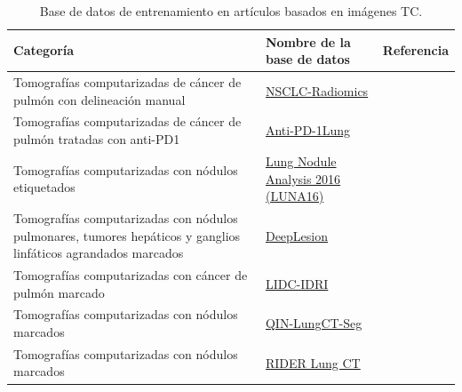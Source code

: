\documentclass[11pt,a4paper,openany]{article}
\begin{document}
    \begin{table}[H]
            \caption{Base de datos de entrenamiento en artículos basados en imágenes TC.\label{tab:TCDatabase}}
            \begin{tabular}{p{6.5cm} p{4cm}  p{4cm}}
            \hline
            \bf{Categoría} & \bf{Nombre de la base de datos} & \bf{Referencia} \\
            \hline
            Tomografías computarizadas de cáncer de pulmón con delineación manual & \href{https://www.cancerimagingarchive.net/collection/nsclc-radiomics/}{NSCLC-Radiomics} & \cite{Woo2021} \\
            \hline
            Tomografías computarizadas de cáncer de pulmón tratadas con anti-PD1 & \href{https://www.cancerimagingarchive.net/collection/anti-pd-1_lung/}{Anti-PD-1Lung} & \cite{Jiang2019} \\
            \hline
            Tomografías computarizadas con nódulos etiquetados & \href{https://luna16.grand-challenge.org/Data/}{Lung Nodule Analysis 2016 (LUNA16)} & \cite{Alakwaa2017,Salama2021,V2023} \\
            \hline
            Tomografías computarizadas con nódulos pulmonares, tumores hepáticos y ganglios linfáticos agrandados marcados & \href{https://nihcc.app.box.com/v/DeepLesion}{DeepLesion} & \cite{Tang2018,Xie2021} \\
            \hline
            Tomografías computarizadas con cáncer de pulmón marcado & \href{https://www.cancerimagingarchive.net/collection/lidc-idri/}{LIDC-IDRI} & \cite{Liu2018,Yang2021,Dutande2021,Aversano2022,V2023,Wu2023} \\
            \hline
            Tomografías computarizadas con nódulos marcados &\href{https://www.cancerimagingarchive.net/analysis-result/qin-lungct-seg/}{QIN-LungCT-Seg}& \cite{Tan2021,Woo2021}\\
            \hline
            Tomografías computarizadas con nódulos marcados & \href{https://www.cancerimagingarchive.net/collection/lidc-idri/}{RIDER Lung CT} & \cite{Cifci2022,Woo2021} \\
            \hline
            \end{tabular}
    \end{table}
\end{document}
